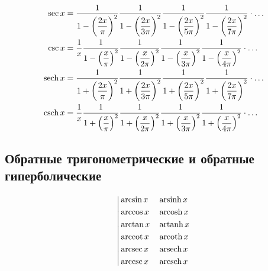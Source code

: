 \begin{equation*}
\begin{aligned}
\sec{x} &=
\frac{1}{1 - \left(\displaystyle \frac{2 x}{\pi} \right)^2}
\frac{1}{1 - \left(\displaystyle \frac{2 x}{3 \pi} \right)^2}
\frac{1}{1 - \left(\displaystyle \frac{2 x}{5 \pi} \right)^2}
\frac{1}{1 - \left(\displaystyle \frac{2 x}{7 \pi} \right)^2}
\cdot \ldots \\
\csc{x} &= \frac{1}{x} 
\frac{1}{1 - \left(\displaystyle \frac{x}{\pi} \right)^2}
\frac{1}{1 - \left(\displaystyle \frac{x}{2 \pi} \right)^2}
\frac{1}{1 - \left(\displaystyle \frac{x}{3 \pi} \right)^2}
\frac{1}{1 - \left(\displaystyle \frac{x}{4 \pi} \right)^2}
\cdot \ldots \\
\operatorname{sech}{x} &=
\frac{1}{1 + \left(\displaystyle \frac{2 x}{\pi} \right)^2}
\frac{1}{1 + \left(\displaystyle \frac{2 x}{3 \pi} \right)^2}
\frac{1}{1 + \left(\displaystyle \frac{2 x}{5 \pi} \right)^2}
\frac{1}{1 + \left(\displaystyle \frac{2 x}{7 \pi} \right)^2}
\cdot \ldots \\
\operatorname{csch}{x} &= \frac{1}{x} 
\frac{1}{1 + \left(\displaystyle \frac{x}{\pi} \right)^2}
\frac{1}{1 + \left(\displaystyle \frac{x}{2 \pi} \right)^2}
\frac{1}{1 + \left(\displaystyle \frac{x}{3 \pi} \right)^2}
\frac{1}{1 + \left(\displaystyle \frac{x}{4 \pi} \right)^2}
\cdot \ldots \\
\end{aligned}
\end{equation*}

\subsection{Обратные тригонометрические и обратные гиперболические}

\begin{equation*}
\left|
\begin{aligned}
&\arcsin{x} & &\operatorname{arsinh}{x} \\
&\arccos{x} & &\operatorname{arcosh}{x} \\
&\arctan{x} & &\operatorname{artanh}{x} \\
&\operatorname{arccot}{x} & &\operatorname{arcoth}{x} \\
&\operatorname{arcsec}{x} & &\operatorname{arsech}{x} \\
&\operatorname{arccsc}{x} & &\operatorname{arcsch}{x} \\
\end{aligned}
\right.
\end{equation*}

